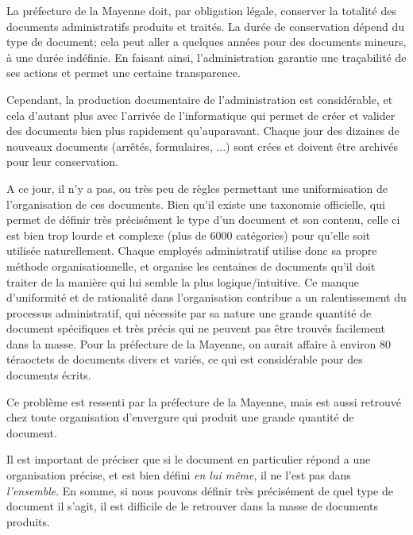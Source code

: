 La préfecture de la Mayenne doit, par obligation légale, conserver la totalité des documents administratifs produits et traités.
La durée de conservation dépend du type de document; cela peut aller a quelques années pour des documents mineurs, à une durée indéfinie.
En faisant ainsi, l'administration garantie une traçabilité de ses actions et permet une certaine transparence. 
\\
\par
Cependant, la production documentaire de l'administration est considérable, et cela d'autant plus avec l'arrivée de l'informatique qui permet de créer et valider des documents bien plus rapidement qu'auparavant.
Chaque jour des dizaines de nouveaux documents (arrêtés, formulaires, ...) sont crées et doivent être archivés pour leur conservation.
\\
\par
A ce jour, il n'y a pas, ou très peu de règles permettant une uniformisation de l'organisation de ces documents.
Bien qu'il existe une taxonomie officielle, qui permet de définir très précisément le type d'un document et son contenu, celle ci est bien trop lourde et complexe (plus de 6000 catégories) pour qu'elle soit utilisée naturellement.
Chaque employés administratif utilise donc sa propre méthode organisationnelle, et organise les centaines de documents qu'il doit traiter de la manière qui lui semble la plus logique/intuitive.
Ce manque d'uniformité et de rationalité dans l'organisation contribue a un ralentissement du processus administratif, qui nécessite par sa nature une grande quantité de document spécifiques et très précis qui ne peuvent pas être trouvés facilement dans la masse.
Pour la préfecture de la Mayenne, on aurait affaire à environ 80 téraoctets de documents divers et variés, ce qui est considérable pour des documents écrits. 
\\
\par
Ce problème est ressenti par la préfecture de la Mayenne, mais est aussi retrouvé chez toute organisation d'envergure qui produit une grande quantité de document. 
\\
\par
Il est important de préciser que si le document en particulier répond a une organisation précise, et est bien défini \textit{en lui même}, il ne l'est pas dans \textit{l'ensemble}.
En somme, si nous pouvons définir très précisément de quel type de document il s'agit, il est difficile de le retrouver dans la masse de documents produits.
